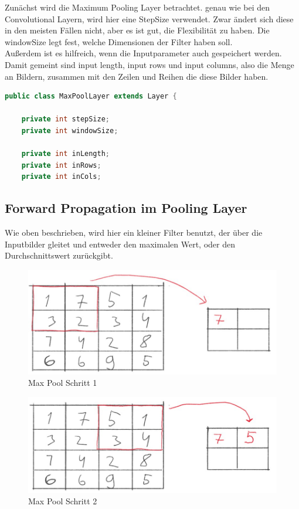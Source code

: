 \documentclass[12pt]{article}
\begin{document}
Zunächst wird die Maximum Pooling Layer betrachtet.
genau wie bei den Convolutional Layern, wird hier eine StepSize verwendet. Zwar ändert sich diese in den meisten Fällen nicht, aber es ist gut, die Flexibilität zu haben.
Die windowSize legt fest, welche Dimensionen der Filter haben soll.
\\Außerdem ist es hilfreich, wenn die Inputparameter auch gespeichert werden. Damit gemeint sind input length, input rows und input columns, also die Menge an Bildern, zusammen mit den Zeilen und Reihen die diese Bilder haben.

\begin{lstlisting}[language=Java]
public class MaxPoolLayer extends Layer {

    private int stepSize;
    private int windowSize;

    private int inLength;
    private int inRows;
    private int inCols;
\end{lstlisting} 

\subsection{Forward Propagation im Pooling Layer}
Wie oben beschrieben, wird hier ein kleiner Filter benutzt, der über die Inputbilder gleitet und entweder den maximalen Wert, oder den Durchschnittswert zurückgibt. 

\begin{figure}[H]
\centering
\includegraphics[scale=0.40]{Images/008_MaxPool1.jpg}
\caption{Max Pool Schritt  1}
\label{Max Pool Schritt  1}
\end{figure}

\begin{figure}[H]
\centering
\includegraphics[scale=0.40]{Images/009_MaxPool2.jpg}
\caption{Max Pool Schritt 2}
\label{Max Pool Schritt  2}
\end{figure}
\end{document}
